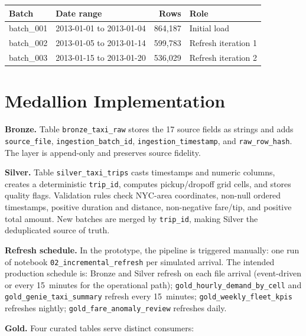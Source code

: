 \documentclass[10pt,a4paper]{article}
\begin{document}
\begin{table}[H]
\centering
\small
\begin{tabular}{llrl}
\toprule
Batch & Date range & Rows & Role \\
\midrule
batch\_001 & 2013-01-01 to 2013-01-04 & 864,187 & Initial load \\
batch\_002 & 2013-01-05 to 2013-01-14 & 599,783 & Refresh iteration 1 \\
batch\_003 & 2013-01-15 to 2013-01-20 & 536,029 & Refresh iteration 2 \\
\bottomrule
\end{tabular}
\end{table}

\section{Medallion Implementation}

\textbf{Bronze.} Table \texttt{bronze\_taxi\_raw} stores the 17 source fields as strings and adds \texttt{source\_file}, \texttt{ingestion\_batch\_id}, \texttt{ingestion\_timestamp}, and \texttt{raw\_row\_hash}. The layer is append-only and preserves source fidelity.

\textbf{Silver.} Table \texttt{silver\_taxi\_trips} casts timestamps and numeric columns, creates a deterministic \texttt{trip\_id}, computes pickup/dropoff grid cells, and stores quality flags. Validation rules check NYC-area coordinates, non-null ordered timestamps, positive duration and distance, non-negative fare/tip, and positive total amount. New batches are merged by \texttt{trip\_id}, making Silver the deduplicated source of truth.

\textbf{Refresh schedule.} In the prototype, the pipeline is triggered manually: one run of notebook \texttt{02\_incremental\_refresh} per simulated arrival. The intended production schedule is: Bronze and Silver refresh on each file arrival (event-driven or every 15~minutes for the operational path); \texttt{gold\_hourly\_demand\_by\_cell} and \texttt{gold\_genie\_taxi\_summary} refresh every 15~minutes; \texttt{gold\_weekly\_fleet\_kpis} refreshes nightly; \texttt{gold\_fare\_anomaly\_review} refreshes daily.

\textbf{Gold.} Four curated tables serve distinct consumers:
\end{document}
